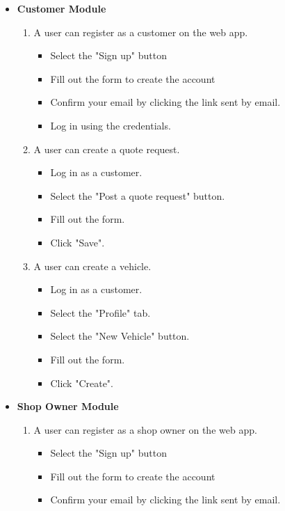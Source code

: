\documentclass[12pt, titlepage]{article}
\begin{document}
\begin{itemize}
    \item \textbf{Customer Module}
    \begin{enumerate}
        \item A user can register as a customer on the web app.
        \begin{itemize}
            \item Select the "Sign up" button
            \item Fill out the form to create the account
            \item Confirm your email by clicking the link sent by email.
            \item Log in using the credentials.
        \end{itemize}
        \item A user can create a quote request.
        \begin{itemize}
            \item Log in as a customer.
            \item Select the "Post a quote request" button.
            \item Fill out the form.
            \item Click "Save".
        \end{itemize}
        \item A user can create a vehicle.
        \begin{itemize}
            \item Log in as a customer.
            \item Select the "Profile" tab.
            \item Select the "New Vehicle" button.
            \item Fill out the form.
            \item Click "Create".
        \end{itemize}
    \end{enumerate}
    \item \textbf{Shop Owner Module}
    \begin{enumerate}
        \item A user can register as a shop owner on the web app.
        \begin{itemize}
            \item Select the "Sign up" button
            \item Fill out the form to create the account
            \item Confirm your email by clicking the link sent by email.

\end{itemize}
\end{enumerate}
\end{itemize}
\end{document}
